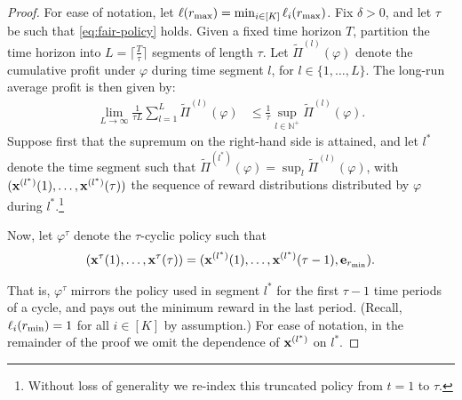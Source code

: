 \documentclass[12pt]{article}
\begin{document}
\begin{proof}
For ease of notation, let $\ell(r_{\max}) = \min_{i\in[K]} \ell_i(r_{\max})$. Fix $\delta > 0$, and let $\tau$ be such that \eqref{eq:fair-policy} holds. Given a fixed time horizon $T$, partition the time horizon into $L = \lceil{\frac{T}{\tau}}\rceil$ segments of length $\tau$. Let $\widetilde{\Pi}^{(l)}(\varphi)$ denote the cumulative profit under $\varphi$ during time segment $l$, for $l \in \{1,\ldots,{L}\}$. The long-run average profit is then given by:
\begin{align*}
    \lim_{L\to\infty} \frac{1}{\tau L} \sum_{l=1}^L \widetilde{\Pi}^{(l)}(\varphi) &\leq \frac1\tau \sup_{l \in \mathbb{N}^+} \widetilde{\Pi}^{(l)}(\varphi).
\end{align*}
Suppose first that the supremum on the right-hand side is attained, and let $l^*$ denote the time segment such that $\widetilde{\Pi}^{(l^*)}(\varphi) = \sup_{l} \widetilde{\Pi}^{(l)}(\varphi)$, with $(\mathbf{x}^{(l^*)}(1),\ldots,\mathbf{x}^{(l^*)}(\tau))$ the sequence of reward distributions distributed by $\varphi$ during $l^*$.\footnote{Without loss of generality we re-index this truncated policy from $t = 1$ to $\tau$.} 

Now, let ${\varphi}^\tau$ denote the $\tau$-cyclic policy such that
\begin{align}\label{eq:mirror-def}
(\mathbf{x}^\tau(1),\ldots,\mathbf{x}^\tau(\tau)) = (\mathbf{x}^{(l^*)}(1),\ldots,\mathbf{x}^{(l^*)}(\tau-1),\mathbf{e}_{r_{\min}}).
\end{align}

That is, ${\varphi}^\tau$ mirrors the policy used in segment $l^*$ for the first $\tau-1$ time periods of a cycle, and pays out the minimum reward in the last period. (Recall, $\ell_i(r_{\min}) = 1$ for all $i \in [K]$ by assumption.)  For ease of notation, in the remainder of the proof we omit the dependence of $\mathbf{x}^{(l^*)}$ on $l^*$.


\end{proof}
\end{document}
